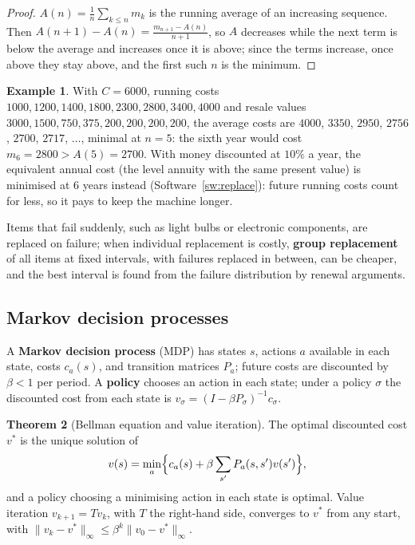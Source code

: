 \documentclass[11pt,a4paper]{article}
\numberwithin{equation}{section}
\theoremstyle{definition}
\newtheorem{thm}{Theorem}[subsection]
\newtheorem{exa}[thm]{Example}
\begin{document}
\begin{proof}
$A(n) = \frac1n\sum_{k \leq n}m_k$ is the running average of an increasing sequence. Then $A(n + 1) - A(n) = \frac{m_{n + 1} - A(n)}{n + 1}$, so $A$ decreases while the next term is below the average and increases once it is above; since the terms increase, once above they stay above, and the first such $n$ is the
minimum.
\end{proof}

\begin{exa}
\label{ex:machine}
With $C = 6000$, running costs $1000, 1200, 1400, 1800, 2300, 2800, 3400, 4000$ and resale values $3000, 1500, 750, 375, 200, 200, 200, 200$, the average costs are $4000$, $3350$, $2950$, $2756$, $2700$, $2717$, $\ldots$, minimal at $n = 5$: the sixth year would cost $m_6 = 2800 > A(5) = 2700$. With money discounted at $10\%$ a year, the
equivalent annual cost (the level annuity with the same present value) is minimised at $6$ years instead (Software~\ref{sw:replace}): future running costs count for less, so it pays to keep the machine longer.
\end{exa}

Items that fail suddenly, such as light bulbs or electronic components, are replaced on failure; when individual replacement is costly, \textbf{group replacement} of all items at fixed intervals, with failures replaced in between, can be cheaper, and the best interval is found from the failure distribution by renewal arguments.

\subsection{Markov decision processes}
\label{ssec:mdp}

A \textbf{Markov decision process} (MDP) has states $s$, actions $a$ available in each state, costs $c_a(s)$, and transition matrices $P_a$; future costs are discounted by $\beta < 1$ per period. A \textbf{policy} chooses an action in each state; under a policy $\sigma$ the discounted cost from each state is
$v_\sigma = (I - \beta P_\sigma)^{-1}c_\sigma$.

\begin{thm}[Bellman equation and value iteration]
\label{thm:mdp}
The optimal discounted cost $v^*$ is the unique solution of
\[
v(s) = \min_a\Bigl\{c_a(s) + \beta\sum_{s'}P_a(s, s')v(s')\Bigr\} ,
\]
and a policy choosing a minimising action in each state is optimal. Value iteration $v_{k + 1} = Tv_k$, with $T$ the right-hand side, converges to $v^*$ from any start, with $\|v_k - v^*\|_\infty \leq \beta^k\|v_0 - v^*\|_\infty$.
\end{thm}
\end{document}
